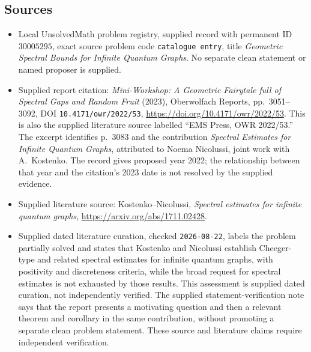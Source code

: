 \documentclass[11pt]{article}
\begin{document}
\subsection{Sources}
\begin{itemize}
\item Local UnsolvedMath problem registry, supplied record with permanent ID \(30005295\), exact source problem code \texttt{catalogue entry}, title \emph{Geometric Spectral Bounds for Infinite Quantum Graphs}. No separate clean statement or named proposer is supplied.
\item Supplied report citation: \emph{Mini-Workshop: A Geometric Fairytale full of Spectral Gaps and Random Fruit} (2023), Oberwolfach Reports, pp.\ 3051--3092, DOI \texttt{10.4171/owr/2022/53}, \url{https://doi.org/10.4171/owr/2022/53}. This is also the supplied literature source labelled ``EMS Press, OWR 2022/53.'' The excerpt identifies p.\ 3083 and the contribution \emph{Spectral Estimates for Infinite Quantum Graphs}, attributed to Noema Nicolussi, joint work with A.\ Kostenko. The record gives proposed year 2022; the relationship between that year and the citation's 2023 date is not resolved by the supplied evidence.
\item Supplied literature source: Kostenko--Nicolussi, \emph{Spectral estimates for infinite quantum graphs}, \url{https://arxiv.org/abs/1711.02428}.
\item Supplied dated literature curation, checked \texttt{2026-08-22}, labels the problem partially solved and states that Kostenko and Nicolussi establish Cheeger-type and related spectral estimates for infinite quantum graphs, with positivity and discreteness criteria, while the broad request for spectral estimates is not exhausted by those results. This assessment is supplied dated curation, not independently verified. The supplied statement-verification note says that the report presents a motivating question and then a relevant theorem and corollary in the same contribution, without promoting a separate clean problem statement. These source and literature claims require independent verification.
\end{itemize}
\end{document}
